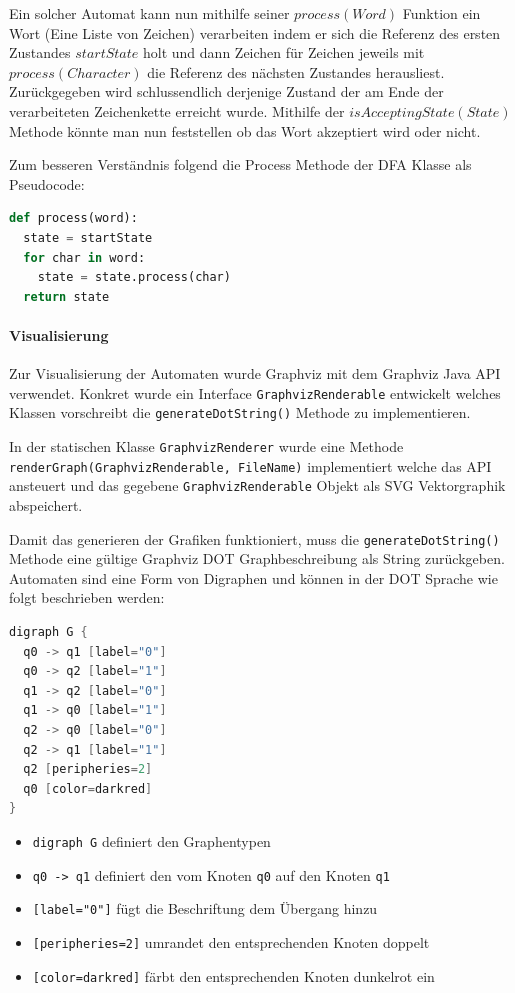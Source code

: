 Ein solcher Automat kann nun mithilfe seiner $process(Word)$ Funktion ein Wort (Eine Liste von Zeichen) verarbeiten indem er sich die Referenz des ersten Zustandes $startState$ holt und dann Zeichen für Zeichen jeweils mit $process(Character)$ die Referenz des nächsten Zustandes herausliest. Zurückgegeben wird schlussendlich derjenige Zustand der am Ende der verarbeiteten Zeichenkette erreicht wurde. Mithilfe der $isAcceptingState(State)$ Methode könnte man nun feststellen ob das Wort akzeptiert wird oder nicht. 

Zum besseren Verständnis folgend die Process Methode der DFA Klasse als Pseudocode:

\begin{lstlisting}[language=Python, caption={Process Methode der DFA Klasse}]
def process(word):
  state = startState
  for char in word:
    state = state.process(char)
  return state
\end{lstlisting}

\paragraph{Visualisierung}
Zur Visualisierung der Automaten wurde Graphviz \cite{graphviz} mit dem Graphviz Java API \cite{graphvizjava} verwendet. Konkret wurde ein Interface \lstinline$GraphvizRenderable$ entwickelt welches Klassen vorschreibt die \lstinline$generateDotString()$ Methode zu implementieren.

In der statischen Klasse \lstinline$GraphvizRenderer$ wurde eine Methode \lstinline$renderGraph(GraphvizRenderable, FileName)$ implementiert welche das API ansteuert und das gegebene \lstinline$GraphvizRenderable$ Objekt als SVG Vektorgraphik abspeichert.

Damit das generieren der Grafiken funktioniert, muss die \lstinline$generateDotString()$ Methode eine gültige Graphviz DOT Graphbeschreibung als String zurückgeben. Automaten sind eine Form von Digraphen und können in der DOT Sprache wie folgt beschrieben werden:

\begin{lstlisting}[language=Java, caption={Automat in DOT Sprache}, label={lst:dot_language}]
digraph G {
  q0 -> q1 [label="0"]
  q0 -> q2 [label="1"]
  q1 -> q2 [label="0"]
  q1 -> q0 [label="1"]
  q2 -> q0 [label="0"]
  q2 -> q1 [label="1"]
  q2 [peripheries=2]
  q0 [color=darkred]
}
\end{lstlisting}

\begin{itemize}
  \item \lstinline$digraph G$ definiert den Graphentypen
  \item \lstinline$q0 -> q1$ definiert den vom Knoten \lstinline$q0$ auf den Knoten \lstinline$q1$
  \item \lstinline$[label="0"]$ fügt die Beschriftung \frqq dem Übergang hinzu
  \item \lstinline$[peripheries=2]$ umrandet den entsprechenden Knoten doppelt
  \item \lstinline$[color=darkred]$ färbt den entsprechenden Knoten dunkelrot ein
\end{itemize}


